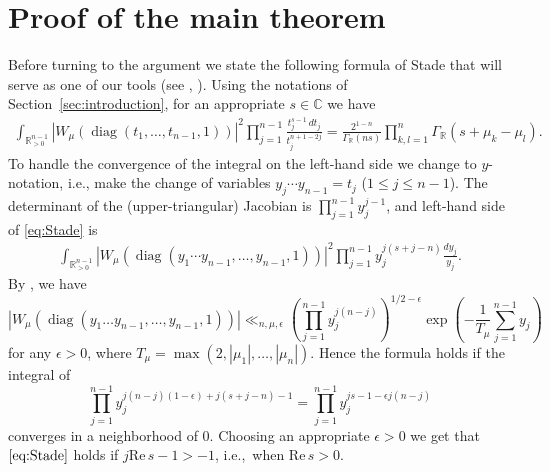 \documentclass[11pt, oneside]{amsart}
\theoremstyle{plain}
\theoremstyle{remark}
\newcommand{\R}{\mathbb{R}}
\newcommand{\C}{\mathbb{C}}
\renewcommand{\C}{\mathbb{C}}
\newcommand{\abs}[1]{\left|#1\right|}
\newcommand{\ree}{\mathrm{Re}\,}
\DeclareMathOperator{\diag}{diag}
\begin{document}
\section{Proof of the main theorem}\label{sec:proof}

Before turning to the argument we state the following formula of Stade that will serve as one of our tools (see \cite[Equation (33)]{BHM20}, \cite[Theorem 1.1]{Sta02}). Using
the notations of Section~\ref{sec:introduction}, for an appropriate $s\in\C$ we have
\begin{align}\label{eq:Stade}
\int_{\R_{>0}^{n-1}}\abs{W_\mu(\diag(t_1,\dots,t_{n-1},1))}^2\prod_{j=1}^{n-1}\frac{t_j^{s-1}\,dt_j}{t_j^{n+1-2j}}=\frac{2^{1-n}}{\Gamma_\R(ns)}\prod_{k,l=1}^n\Gamma_\R(s+\mu_k-\mu_l).
\end{align}
To handle the convergence of the integral on the left-hand side we change to $y$-notation, i.e., 
make the change of variables  $y_j\cdots y_{n-1}=t_j$ ($1\leq j\leq n-1$). The determinant of the 
(upper-triangular) Jacobian is $\prod_{j=1}^{n-1}y_j^{j-1}$, and  left-hand side of \eqref{eq:Stade}
is
\begin{align*}
\int_{\R_{>0}^{n-1}}\abs{W_\mu(\diag(y_1\cdots y_{n-1},\dots,y_{n-1},1))}^2\prod_{j=1}^{n-1}y_j^{j(s+j-n)}\frac{dy_j}{y_j}.
\end{align*}
By \cite[Equation (14)]{BHM20}, we have 
\[
\abs{W_\mu(\diag(y_1\dots y_{n-1},\dots,y_{n-1},1))}\ll_{n,\mu,\epsilon}
\left(\prod_{j=1}^{n-1}y_j^{j(n-j)}\right)^{1/2-\epsilon}
    \exp\left(-\frac1 {T_\mu}\sum_{j=1}^{n-1}y_j\right)
\]
for any $\epsilon>0$, where $T_\mu=\max(2,|\mu_1|,\dots,|\mu_n|)$. Hence the formula holds if the integral of
\[
\prod_{j=1}^{n-1} y_j^{j(n-j)(1-\epsilon)+j(s+j-n)-1}=
\prod_{j=1}^{n-1}y_j^{js-1-\epsilon j(n-j)}
\]
converges in a neighborhood of 0. 
Choosing an appropriate $\epsilon>0$ we get that $\eqref{eq:Stade}$ holds if $j\ree s-1>-1$, i.e.,\ when $\ree s>0$.
\end{document}
